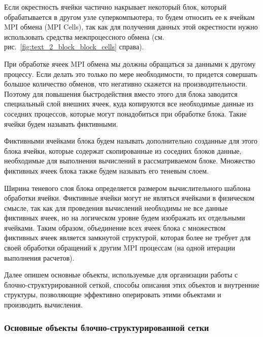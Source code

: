 \begin{definition}
Если окрестность ячейки частично накрывает некоторый блок, который обрабатывается в другом узле суперкомпьютера, то будем относить ее к ячейкам MPI обмена (MPI Cells)\label{term:cell_block_mpi}, так как для получения данных этой окрестности нужно использовать средства межпроцессного обмена (см. рис.~\ref{fig:text_2_block_block_cells} справа).
\end{definition}

При обработке ячеек MPI обмена мы должны обращаться за данными к другому процессу.
Если делать это только по мере необходимости, то придется совершать большое количество обменов, что негативно скажется на производительности.
Поэтому для повышения быстродействия вместо этого для блока заводится специальный слой внешних ячеек, куда копируются все необходимые данные из соседних процессов, которые могут понадобиться при обработке блока.
Такие ячейки будем называть фиктивными\label{term:cell_block_ghost}.

\begin{definition}
Фиктивными ячейками блока будем называть дополнительно созданные для этого блока ячейки, которые содержат скопированные из соседних блоков данные, необходимые для выполнения вычислений в рассматриваемом блоке.
Множество фиктивных ячеек блока также будем называть его теневым слоем\label{term:block_shadow_layer}.
\end{definition}

Ширина теневого слоя блока определяется размером вычислительного шаблона обработки ячейки.
Фиктивные ячейки могут не являться ячейками в физическом смысле, так как для проведения вычислений необходимы не все данные фиктивных ячеек, но на логическом уровне будем изображать их отдельными ячейками.
Таким образом, объединение всех ячеек блока с множеством фиктивных ячеек является замкнутой структурой, которая более не требует для своей обработки обращений к другим MPI процессам (на одной итерации выполнения расчетов).

Далее опишем основные объекты, используемые для организации работы с блочно-структурированной сеткой, способы описания этих объектов и внутренние структуры, позволяющие эффективно оперировать этими объектами и производить вычисления.

\subsubsection{Основные объекты блочно-структурированной сетки}

